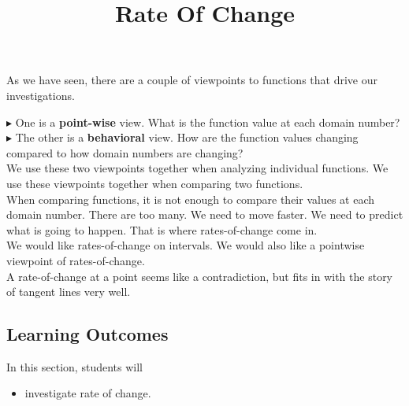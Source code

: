 \documentclass{ximera}
\title{Rate Of Change}
\begin{document}
\begin{abstract}
\end{abstract}
\maketitle







As we have seen, there are a couple of viewpoints to functions that drive our investigations.

$\blacktriangleright$ One is a \textbf{\textcolor{purple!85!blue}{point-wise}} view.  What is the function value at each domain number? \\


$\blacktriangleright$ The other is a \textbf{\textcolor{purple!85!blue}{behavioral}} view.  How are the function values changing compared to how domain numbers are changing? \\



We use these two viewpoints together when analyzing individual functions.  We use these viewpoints together when comparing two functions. \\

When comparing functions, it is not enough to compare their values at each domain number.  There are too many.  We need to move faster.  We need to predict what is going to happen. That is where rates-of-change come in. \\




We would like rates-of-change on intervals.  We would also like a pointwise viewpoint of rates-of-change. \\



A rate-of-change at a point seems like a contradiction, but fits in with the story of tangent lines very well.













\subsection*{Learning Outcomes}


\begin{sectionOutcomes}
In this section, students will 

\begin{itemize}
\item investigate rate of change.

\end{itemize}
\end{sectionOutcomes}
\end{document}
